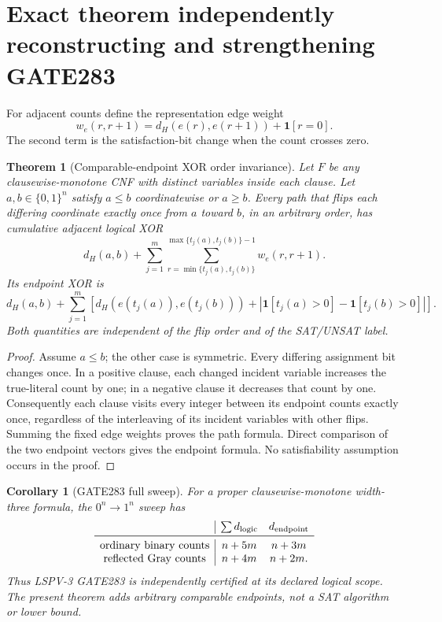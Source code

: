 \documentclass[11pt]{article}
\newtheorem{theorem}{Theorem}
\newtheorem{corollary}{Corollary}
\begin{document}
\section{Exact theorem independently reconstructing and strengthening GATE283}
For adjacent counts define the representation edge weight
\[
 w_e(r,r+1)=d_H(e(r),e(r+1))+\mathbf 1[r=0].
\]
The second term is the satisfaction-bit change when the count crosses zero.

\begin{theorem}[Comparable-endpoint XOR order invariance]
Let $F$ be any clausewise-monotone CNF with distinct variables inside each clause.
Let $a,b\in\{0,1\}^n$ satisfy $a\le b$ coordinatewise or $a\ge b$.  Every path that
flips each differing coordinate exactly once from $a$ toward $b$, in an arbitrary
order, has cumulative adjacent logical XOR
\[
 d_H(a,b)+\sum_{j=1}^m
 \sum_{r=\min\{t_j(a),t_j(b)\}}^{\max\{t_j(a),t_j(b)\}-1}w_e(r,r+1).
\]
Its endpoint XOR is
\[
 d_H(a,b)+\sum_{j=1}^m
 \left[d_H(e(t_j(a)),e(t_j(b)))+
 \left|\mathbf1[t_j(a)>0]-\mathbf1[t_j(b)>0]\right|\right].
\]
Both quantities are independent of the flip order and of the SAT/UNSAT label.
\end{theorem}
\begin{proof}
Assume $a\le b$; the other case is symmetric.  Every differing assignment bit changes
once.  In a positive clause, each changed incident variable increases the true-literal
count by one; in a negative clause it decreases that count by one.  Consequently each
clause visits every integer between its endpoint counts exactly once, regardless of
the interleaving of its incident variables with other flips.  Summing the fixed edge
weights proves the path formula.  Direct comparison of the two endpoint vectors gives
the endpoint formula.  No satisfiability assumption occurs in the proof.
\end{proof}

\begin{corollary}[GATE283 full sweep]
For a proper clausewise-monotone width-three formula, the $0^n\to1^n$ sweep has
\[
\begin{array}{c|cc}
&\sum d_{\rm logic}&d_{\rm endpoint}\\\midrule
\text{ordinary binary counts}&n+5m&n+3m\\
\text{reflected Gray counts}&n+4m&n+2m.
\end{array}
\]
Thus LSPV-3 GATE283 is independently certified at its declared logical scope.  The
present theorem adds arbitrary comparable endpoints, not a SAT algorithm or lower bound.
\end{corollary}
\end{document}
